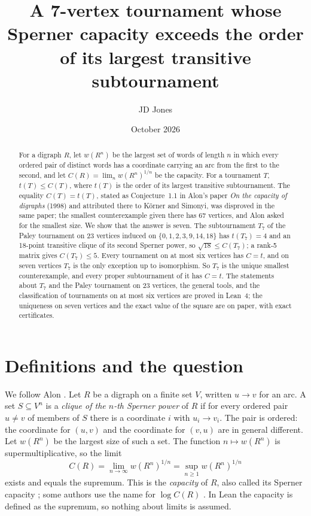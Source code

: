 \documentclass[11pt]{article}
\title{A 7-vertex tournament whose Sperner capacity exceeds the order of its largest transitive subtournament}
\author{JD Jones}
\date{October 2026}
\theoremstyle{definition}
\theoremstyle{remark}
\begin{document}
\maketitle

\begin{abstract}
For a digraph $R$, let $w(R^n)$ be the largest set of words of length $n$ in which every ordered pair
of distinct words has a coordinate carrying an arc from the first to the second, and let
$C(R) = \lim_n w(R^n)^{1/n}$ be the capacity. For a tournament $T$, $t(T) \le C(T)$, where $t(T)$
is the order of its largest transitive subtournament. The equality $C(T) = t(T)$, stated as
Conjecture~1.1 in Alon's paper \emph{On the capacity of digraphs} (1998) and attributed there to
K\"orner and Simonyi, was disproved in the same paper; the smallest counterexample given there
has 67 vertices, and Alon asked for the smallest size. We show that the answer is seven. The
subtournament $T_7$ of the Paley tournament on 23 vertices induced on $\{0,1,2,3,9,14,18\}$ has
$t(T_7) = 4$ and an 18-point transitive clique of its second Sperner power, so
$\sqrt{18} \le C(T_7)$; a rank-5 matrix gives $C(T_7) \le 5$. Every tournament on at most six
vertices has $C = t$, and on seven vertices $T_7$ is the only exception up to isomorphism. So
$T_7$ is the unique smallest counterexample, and every proper subtournament of it has $C = t$.
The statements about $T_7$ and the Paley tournament on 23 vertices, the general tools, and the
classification of tournaments on at most six vertices are proved in Lean~4; the uniqueness on seven
vertices and the exact value of the square are on paper, with exact certificates.
\end{abstract}

\section{Definitions and the question}\label{sec:defs}

We follow Alon \cite{alon}. Let $R$ be a digraph on a finite set $V$, written $u \to v$ for an arc.
A set $S \subseteq V^n$ is a \emph{clique of the $n$-th Sperner power} of $R$ if for every ordered
pair $u \ne v$ of members of $S$ there is a coordinate $i$ with $u_i \to v_i$. The pair is ordered:
the coordinate for $(u, v)$ and the coordinate for $(v, u)$ are in general different. Let $w(R^n)$
be the largest size of such a set. The function $n \mapsto w(R^n)$ is supermultiplicative, so the
limit
\[
C(R) = \lim_{n \to \infty} w(R^n)^{1/n} = \sup_{n \ge 1} w(R^n)^{1/n}
\]
exists and equals the supremum. This is the \emph{capacity} of $R$, also called its Sperner capacity
\cite{kov}; some authors use the name for $\log C(R)$ \cite{gkv, ks}. In Lean the capacity is
defined as the supremum, so nothing about limits is assumed.
\end{document}
